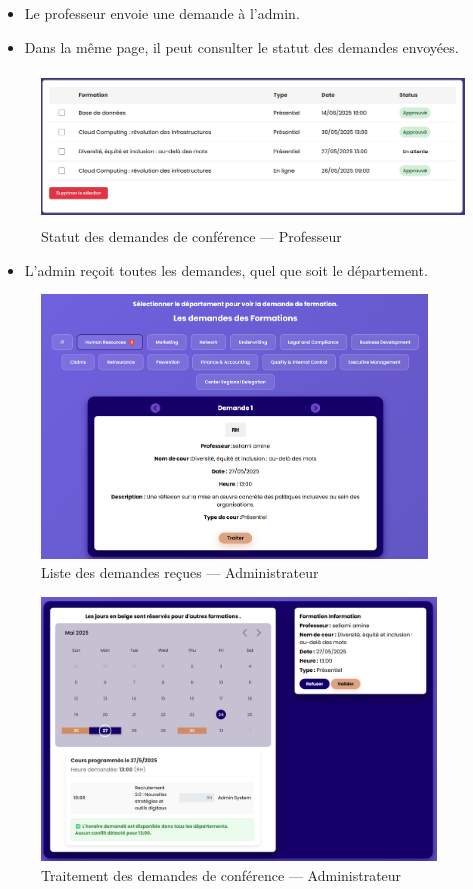 \documentclass{article}
\begin{document}
\begin{itemize}
    \item Le professeur envoie une demande à l'admin.
    \item Dans la même page, il peut consulter le statut des demandes envoyées.
\end{itemize}
\begin{figure}[H]
  \centering
  \includegraphics[height=4cm]{SATUTS.png}
  \caption{Statut des demandes de conférence — Professeur}
  \label{fig:statut-conf}
\end{figure}

\begin{itemize}
    \item L’admin reçoit toutes les demandes, quel que soit le département.
\end{itemize}
\begin{figure}[H]
  \centering
  \includegraphics[height=7cm]{LISTE-DEM.png}
  \caption{Liste des demandes reçues — Administrateur}
  \label{fig:liste-dem}
\end{figure}

\begin{figure}[H]
  \centering
  \includegraphics[height=7cm]{TRAITER.png}
  \caption{Traitement des demandes de conférence — Administrateur}
  \label{fig:traiter-dem}
\end{figure}
\end{document}

